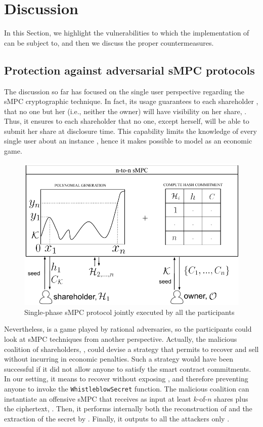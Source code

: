 \section{Discussion}\label{sect:impl_attacks}

In this Section, we highlight the vulnerabilities to which the implementation of \shortname can be subject to, and then we discuss the proper countermeasures.  

\subsection{Protection against adversarial sMPC protocols}\label{sect:impl_mpc}

The discussion so far has focused on the single user perspective regarding the sMPC cryptographic technique.
In fact, its usage guarantees to each shareholder \shareholder, that no one but her (i.e., neither the owner) will have visibility on her share, \share.
Thus, it ensures to each shareholder that no one, except herself, will be able to submit her share at disclosure time. 
This capability limits the knowledge of every single user about an instance \shortname, hence it makes possible to model \shortname as an economic game. 

\begin{figure}[t]
	\centering
	\includegraphics[width=0.9\columnwidth]{fig/mpc_rev_1.pdf}
	\caption{Single-phase sMPC protocol jointly executed by all the participants}
	\label{fig:mpc1}
\end{figure}

Nevertheless, \shortname is a game played by rational adversaries, so the participants could look at sMPC techniques from another perspective.
Actually, the malicious coalition of shareholders, \coalition, could devise a strategy that permits to recover and sell \secret without incurring in economic penalties. 
Such a strategy would have been successful if it did not allow anyone to satisfy the smart contract commitments.
In our setting, it means to recover \secret without exposing \key, and therefore preventing anyone to invoke the \texttt{WhistleblowSecret} function.
The malicious coalition can instantiate an offensive sMPC that receives as input at least $k$-of-$n$ shares plus the ciphertext, \ciphertext.
Then, it performs internally both the reconstruction of \key and the extraction of the secret by \unwrap.
Finally, it outputs to all the attackers only \secret. 

